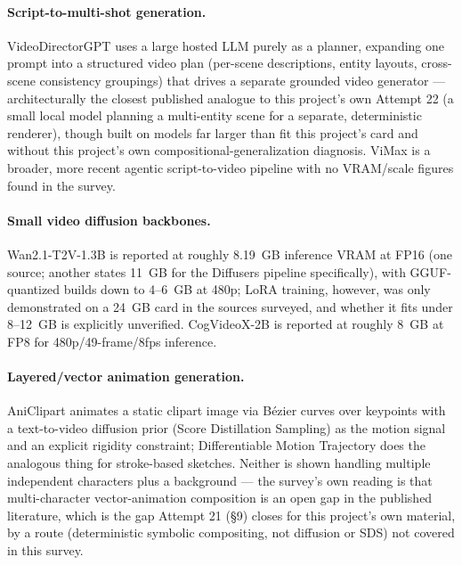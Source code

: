 \documentclass[11pt]{article}
\newcommand{\secsym}{\S}
\begin{document}
\paragraph{Script-to-multi-shot generation.} VideoDirectorGPT
\cite{lin2024videodirectorgpt} uses a large hosted LLM purely as a
planner, expanding one prompt into a structured video plan (per-scene
descriptions, entity layouts, cross-scene consistency groupings) that
drives a separate grounded video generator --- architecturally the closest
published analogue to this project's own Attempt 22 (a small local model
planning a multi-entity scene for a separate, deterministic renderer),
though built on models far larger than fit this project's card and
without this project's own compositional-generalization diagnosis. ViMax
\cite{vimax2025} is a broader, more recent agentic script-to-video
pipeline with no VRAM/scale figures found in the survey.

\paragraph{Small video diffusion backbones.} Wan2.1-T2V-1.3B
\cite{wanai2025wan21} is reported at roughly 8.19~GB inference VRAM at
FP16 (one source; another states 11~GB for the Diffusers pipeline
specifically), with GGUF-quantized builds down to 4--6~GB at 480p; LoRA
training, however, was only demonstrated on a 24~GB card in the sources
surveyed, and whether it fits under 8--12~GB is explicitly unverified.
CogVideoX-2B \cite{cogvideox2b} is reported at roughly 8~GB at FP8 for
480p/49-frame/8fps inference.

\paragraph{Layered/vector animation generation.} AniClipart
\cite{wu2024aniclipart} animates a static clipart image via B\'ezier
curves over keypoints with a text-to-video diffusion prior (Score
Distillation Sampling) as the motion signal and an explicit rigidity
constraint; Differentiable Motion Trajectory \cite{zhu2025dmt} does the
analogous thing for stroke-based sketches. Neither is shown handling
multiple independent characters plus a background --- the survey's own
reading is that multi-character vector-animation composition is an open
gap in the published literature, which is the gap Attempt 21 (\secsym9)
closes for this project's own material, by a route (deterministic
symbolic compositing, not diffusion or SDS) not covered in this survey.
\end{document}
